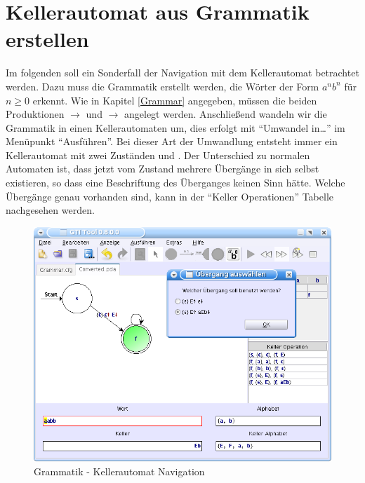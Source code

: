 \section{Kellerautomat aus Grammatik erstellen}

Im folgenden soll ein Sonderfall der Navigation mit dem Kellerautomat betrachtet
werden. Dazu muss die Grammatik erstellt werden, die Wörter der Form $a^n b^n$
für $n \geq 0$ erkennt. Wie in Kapitel \ref{Grammar} angegeben, müssen die beiden
Produktionen  $\to$ \TerminalSymbol{$\epsilon$} und
 $\to$ 
angelegt werden. Anschließend wandeln wir die Grammatik in einen
Kellerautomaten um, dies erfolgt mit "`Umwandel in\ldots"' im Menüpunkt
"`Ausführen"'. Bei dieser Art der Umwandlung entsteht immer ein Kellerautomat
mit zwei Zuständen  und . Der Unterschied zu normalen
Automaten ist, dass jetzt vom Zustand  mehrere Übergänge in sich
selbst existieren, so dass eine Beschriftung des Überganges keinen Sinn hätte.
Welche Übergänge genau vorhanden sind, kann in der "`Keller Operationen"'
Tabelle nachgesehen werden.\vspace{10pt}

\begin{figure}[h]
\begin{center}
\includegraphics[width=12cm]{images/grammar_pda.png}
\caption{Grammatik - Kellerautomat Navigation}
\end{center}
\end{figure}

